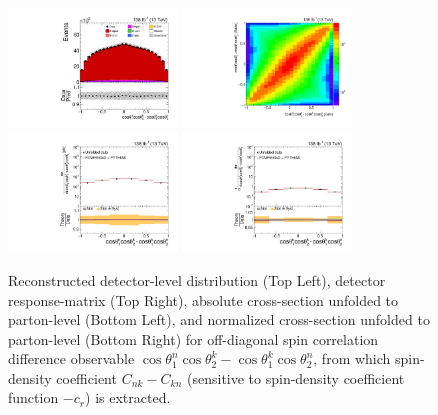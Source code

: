 \clearpage
\begin{figure}[htb]
\begin{center}
 \includegraphics[width=0.40\textwidth]{fig_fullRun2UL/controlplots/combined/Hyp_LLBarCMnk.pdf}
 \includegraphics[width=0.40\textwidth]{fig_fullRun2UL/unfolding/combined/ResponseMatrix_c_Mnk.pdf} \\
 \includegraphics[width=0.40\textwidth]{fig_fullRun2UL/unfolding/combined/UnfoldedResults_c_Mnk.pdf}
 \includegraphics[width=0.40\textwidth]{fig_fullRun2UL/unfolding/combined/UnfoldedResultsNorm_c_Mnk.pdf} \\
\label{fig:c_Mnk}
\caption{Reconstructed detector-level distribution (Top Left), detector response-matrix (Top Right), absolute cross-section unfolded to parton-level (Bottom Left), and normalized cross-section unfolded to parton-level (Bottom Right) for off-diagonal spin correlation difference observable $\cos\theta_{1}^{n}\cos\theta_{2}^{k}-\cos\theta_{1}^{k}\cos\theta_{2}^{n}$, from which spin-density coefficient $C_{nk}-C_{kn}$ (sensitive to spin-density coefficient function $-c_r$) is extracted.}
\end{center}
\end{figure}
